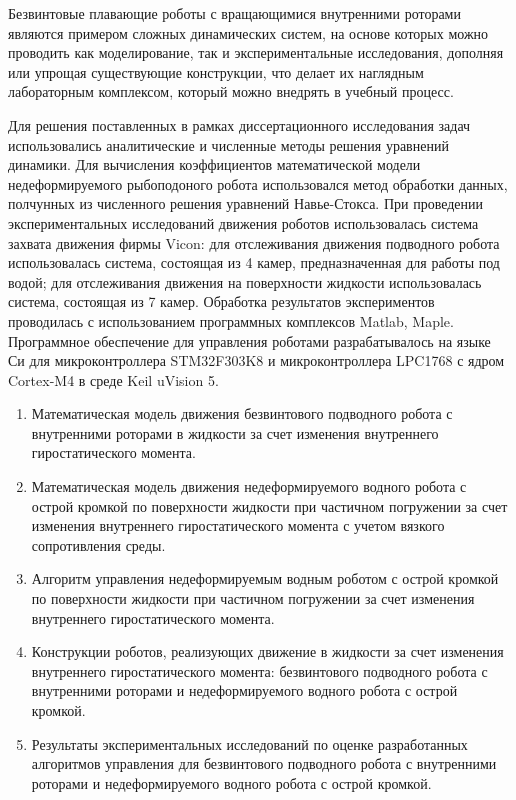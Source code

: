 Безвинтовые плавающие роботы с вращающимися внутренними роторами являются примером сложных динамических систем, на основе которых можно проводить как моделирование, так и экспериментальные исследования, дополняя или упрощая существующие конструкции, что делает их наглядным лабораторным комплексом, который можно внедрять в учебный процесс.

{\methods} Для решения поставленных в рамках диссертационного исследования задач использовались аналитические и численные методы решения уравнений динамики. Для вычисления коэффициентов математической модели недеформируемого рыбоподоного робота использовался метод обработки данных, полчунных из численного решения уравнений Навье-Стокса. При проведении экспериментальных исследований движения роботов использовалась система захвата движения фирмы Vicon: для отслеживания движения подводного робота использовалась система, состоящая из 4 камер, предназначенная для работы под водой; для отслеживания движения на поверхности жидкости использовалась система, состоящая из 7 камер. Обработка результатов экспериментов проводилась с использованием программных комплексов Matlab, Maple. Программное обеспечение для управления роботами разрабатывалось на языке Си для микроконтроллера STM32F303K8 и микроконтроллера LPC1768 с ядром Cortex-M4 в среде Keil uVision 5.

{}
\begin{enumerate}
  \item Математическая модель движения безвинтового подводного робота с внутренними роторами в жидкости за счет изменения внутреннего гиростатического момента.
  \item Математическая модель движения недеформируемого водного робота с острой кромкой по поверхности жидкости при частичном погружении за счет изменения внутреннего гиростатического момента с учетом вязкого сопротивления среды.
  \item Алгоритм управления недеформируемым водным роботом с острой кромкой по поверхности жидкости при частичном погружении за счет изменения внутреннего гиростатического момента.
  \item Конструкции роботов, реализующих движение в жидкости за счет изменения внутреннего гиростатического момента:  безвинтового подводного робота с внутренними роторами и недеформируемого водного робота с острой кромкой.
  \item Результаты экспериментальных исследований по оценке разработанных алгоритмов управления для безвинтового подводного робота с внутренними роторами и недеформируемого водного робота с острой кромкой.
  
\end{enumerate}

